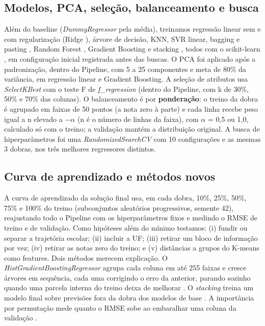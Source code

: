 \documentclass[conference,a4paper]{IEEEtran}
\begin{document}
\subsection{Modelos, PCA, seleção, balanceamento e busca}
Além do baseline (\textit{DummyRegressor} pela média), treinamos regressão linear sem e com regularização (Ridge \cite{hoerl}), árvore de decisão, KNN, SVR linear, bagging e pasting \cite{breiman96}, Random Forest \cite{breiman01}, Gradient Boosting \cite{friedman} e stacking \cite{wolpert}, todos com o scikit-learn \cite{sklearn}, em configuração inicial registrada antes das buscas. O PCA \cite{jolliffe} foi aplicado após a padronização, dentro do Pipeline, com 5 a 25 componentes e meta de 80\% da variância, em regressão linear e Gradient Boosting. A seleção de atributos usa \textit{SelectKBest} com o teste F de \textit{f\_regression} (dentro do Pipeline, com k de 30\%, 50\% e 70\% das colunas). O balanceamento é por \textbf{ponderação}: o treino da dobra é agrupado em faixas de 50 pontos (a nota zero à parte) e cada linha recebe peso igual a n elevado a $-$$\alpha$ (n é o número de linhas da faixa), com $\alpha$ = 0,5 ou 1,0, calculado só com o treino; a validação mantém a distribuição original. A busca de hiperparâmetros foi uma \textit{RandomizedSearchCV} \cite{bergstra} com 10 configurações e as mesmas 3 dobras, nos três melhores regressores distintos.


\subsection{Curva de aprendizado e métodos novos}
A curva de aprendizado da solução final usa, em cada dobra, 10\%, 25\%, 50\%, 75\% e 100\% do treino (subconjuntos aleatórios progressivos, semente 42), reajustando todo o Pipeline com os hiperparâmetros fixos e medindo o RMSE de treino e de validação. Como hipóteses além do mínimo testamos: (i) fundir ou separar a trajetória escolar; (ii) incluir a UF; (iii) retirar um bloco de informação por vez; (iv) retirar as notas zero do treino; e (v) distâncias a grupos do K-means como features. Dois métodos merecem explicação. O \textit{HistGradientBoostingRegressor} agrupa cada coluna em até 255 faixas e cresce árvores em sequência, cada uma corrigindo o erro da anterior, parando sozinho quando uma parcela interna do treino deixa de melhorar \cite{ke,friedman}. O \textit{stacking} treina um modelo final sobre previsões fora da dobra dos modelos de base \cite{wolpert}. A importância por permutação mede quanto o RMSE sobe ao embaralhar uma coluna da validação \cite{skdoc}.
\end{document}
